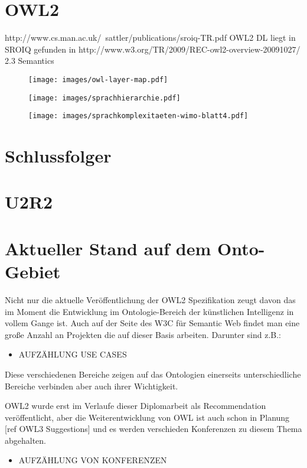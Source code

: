 \section{OWL2}
\label{abschnitt-owl2}
 http://www.cs.man.ac.uk/~sattler/publications/sroiq-TR.pdf
OWL2 DL liegt in SROIQ
gefunden in  http://www.w3.org/TR/2009/REC-owl2-overview-20091027/
2.3 Semantics
\begin{figure}
\texttt{[image: images/owl-layer-map.pdf]}
\end{figure}

\begin{figure}
\texttt{[image: images/sprachhierarchie.pdf]}
\end{figure}

\begin{figure}
\texttt{[image: images/sprachkomplexitaeten-wimo-blatt4.pdf]}
\end{figure}

\section{Schlussfolger}

\section{U2R2}

\section{Aktueller Stand auf dem Onto-Gebiet}
Nicht nur die aktuelle Veröffentlichung der OWL2 Spezifikation zeugt davon das im Moment die Entwicklung im Ontologie-Bereich der künstlichen Intelligenz in vollem Gange ist. Auch auf der Seite des W3C für Semantic Web findet man eine große Anzahl an Projekten die auf dieser Basis arbeiten.
Darunter sind z.B.:
\begin{itemize}
  \item AUFZÄHLUNG USE CASES
\end{itemize}
Diese verschiedenen Bereiche zeigen auf das Ontologien einerseits unterschiedliche Bereiche verbinden aber auch ihrer Wichtigkeit.

OWL2 wurde erst im Verlaufe dieser Diplomarbeit als Recommendation veröffentlicht, aber die Weiterentwicklung von OWL ist auch schon in Planung [ref OWL3 Suggestions] und es werden verschieden Konferenzen zu diesem Thema abgehalten.
\begin{itemize}
  \item AUFZÄHLUNG VON KONFERENZEN
\end{itemize}

